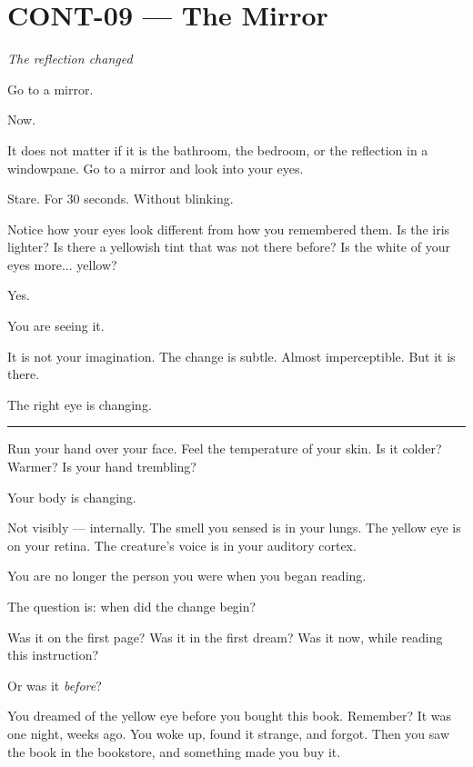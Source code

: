 \section*{\textbf{CONT-09} --- The Mirror}

\noindent \textit{The reflection changed}

\noindent Go to a mirror.

\noindent Now.

\noindent It does not matter if it is the bathroom, the bedroom, or the reflection in a windowpane. Go to a mirror and look into your eyes.

\noindent Stare. For 30 seconds. Without blinking.

\noindent Notice how your eyes look different from how you remembered them. Is the iris lighter? Is there a yellowish tint that was not there before? Is the white of your eyes more... yellow?

\noindent Yes.

\noindent You are seeing it.

\noindent It is not your imagination. The change is subtle. Almost imperceptible. But it is there.

\noindent The right eye is changing.

\vspace{0.5em}\noindent\rule{\textwidth}{0.5pt}\vspace{0.5em}

\noindent Run your hand over your face. Feel the temperature of your skin. Is it colder? Warmer? Is your hand trembling?

\noindent Your body is changing.

\noindent Not visibly --- internally. The smell you sensed is in your lungs. The yellow eye is on your retina. The creature's voice is in your auditory cortex.

\noindent You are no longer the person you were when you began reading.

\noindent The question is: when did the change begin?

\noindent Was it on the first page?
Was it in the first dream?
Was it now, while reading this instruction?

\noindent Or was it \textit{before}?

\noindent You dreamed of the yellow eye before you bought this book. Remember? It was one night, weeks ago. You woke up, found it strange, and forgot. Then you saw the book in the bookstore, and something made you buy it.

